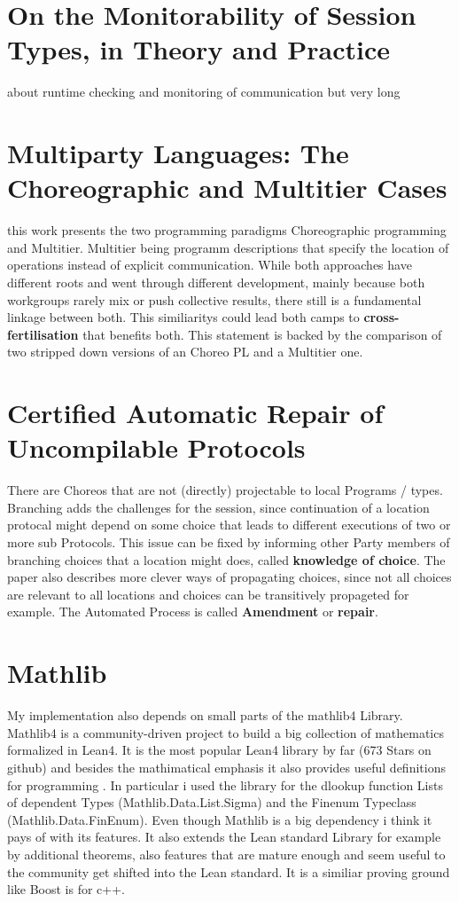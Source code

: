 \section{On the Monitorability of Session Types, in Theory
and Practice}
about runtime checking and monitoring of communication but very long

\section{Multiparty Languages: The Choreographic and
Multitier Cases}

this work presents the two programming paradigms Choreographic programming and Multitier. Multitier being programm descriptions that specify the location of operations instead of explicit communication. While both approaches have different roots and went through different development, mainly because both workgroups rarely mix or push collective results, there still is a fundamental linkage between both. This similiaritys could lead both camps to \textbf{cross-fertilisation} that benefits both. This statement is backed by the comparison of two stripped down versions of an Choreo PL and a Multitier one.

\section{Certified Automatic Repair of Uncompilable Protocols}
There are Choreos that are not (directly) projectable to local Programs / types. Branching adds the challenges for the session, since continuation of a location protocal might depend on some choice that leads to different executions of two or more sub Protocols. This issue can be fixed by informing other Party members of branching choices that a location might does, called \textbf{knowledge of choice}. The paper also describes more clever ways of propagating choices, since not all choices are relevant to all locations and choices can be transitively propageted for example. The Automated Process is called \textbf{Amendment} or \textbf{repair}.


\section{Mathlib}
My implementation also depends on small parts of the mathlib4 Library. Mathlib4 is a community-driven project to build a big collection of mathematics formalized in Lean4. It is the most popular Lean4 library by far (673 Stars on github) and besides the mathimatical emphasis it also provides useful definitions for programming \cite{leanprovercommunity}. In particular i used the library for the dlookup function Lists of dependent Types (Mathlib.Data.List.Sigma) and the Finenum Typeclass (Mathlib.Data.FinEnum).
Even though Mathlib is a big dependency i think it pays of with its features. It also extends the Lean standard Library for example by additional theorems, also features that are mature enough and seem useful to the community get shifted into the Lean standard. It is a similiar proving ground like Boost is for c++.
